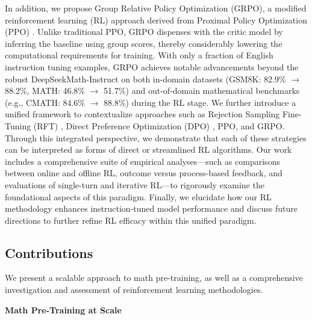 In addition, we propose Group Relative Policy Optimization (GRPO), a modified reinforcement learning (RL) approach derived from Proximal Policy Optimization (PPO) \citep{schulman2017proximal}. Unlike traditional PPO, GRPO dispenses with the critic model by inferring the baseline using group scores, thereby considerably lowering the computational requirements for training. With only a fraction of English instruction tuning examples, GRPO achieves notable advancements beyond the robust DeepSeekMath-Instruct on both in-domain datasets (GSM8K: 82.9\% $\rightarrow$ 88.2\%, MATH: 46.8\% $\rightarrow$ 51.7\%) and out-of-domain mathematical benchmarks (e.g., CMATH: 84.6\% $\rightarrow$ 88.8\%) during the RL stage. We further introduce a unified framework to contextualize approaches such as Rejection Sampling Fine-Tuning (RFT) \citep{yuan2023scaling}, Direct Preference Optimization (DPO) \citep{dpo}, PPO, and GRPO. Through this integrated perspective, we demonstrate that each of these strategies can be interpreted as forms of direct or streamlined RL algorithms. Our work includes a comprehensive suite of empirical analyses—such as comparisons between online and offline RL, outcome versus process-based feedback, and evaluations of single-turn and iterative RL—to rigorously examine the foundational aspects of this paradigm. Finally, we elucidate how our RL methodology enhances instruction-tuned model performance and discuss future directions to further refine RL efficacy within this unified paradigm.

\subsection{Contributions}
We present a scalable approach to math pre-training, as well as a comprehensive investigation and assessment of reinforcement learning methodologies.

\textbf{Math Pre-Training at Scale}

